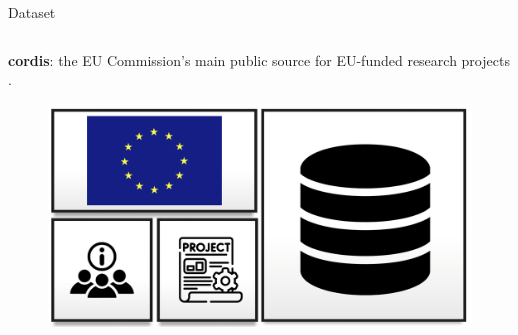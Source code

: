 \begin{tframe}{Dataset}
\begin{columns}
    \begin{column}{0.53\textwidth}

        \textbf{\gls{cordis}}: the EU Commission's main public source for EU-funded research projects \cite{CORDIS_RefData_2018}.
        

        \begin{figure}[htbp]
            \centering
            \includegraphics[width=.6\textwidth]{../img/scenario-analysis/cordis.png}
        \end{figure}


\end{column}
\end{columns}
\end{tframe}
